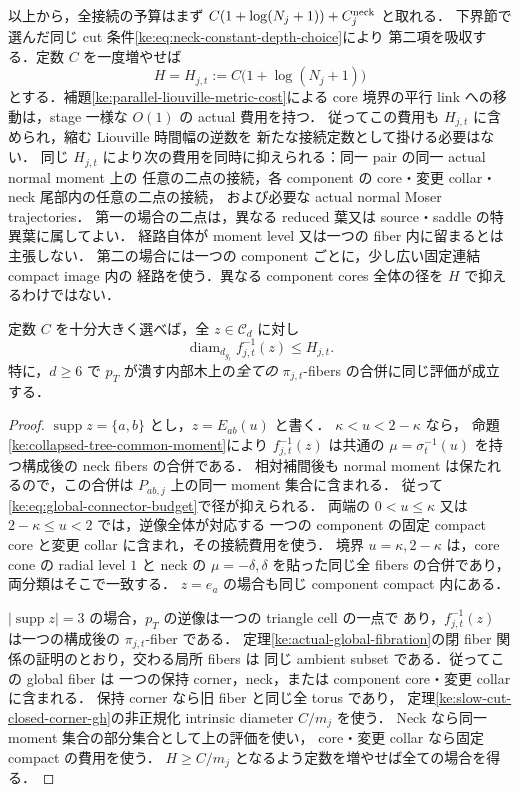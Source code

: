 以上から，全接続の予算はまず
$C(1+\log(N_j+1))+C_j^{\rm neck}$ と取れる．
下界節で選んだ同じ cut 条件\eqref{ke:eq:neck-constant-depth-choice}により
第二項を吸収する．定数 $C$ を一度増やせば
\begin{equation}\label{ke:eq:global-connector-budget}
 H=H_{j,t}:=C\bigl(1+\log(N_j+1)\bigr)
\end{equation}
とする．補題\ref{ke:parallel-liouville-metric-cost}による
core 境界の平行 link への移動は，stage 一様な $O(1)$ の actual 費用を持つ．
従ってこの費用も $H_{j,t}$ に含められ，縮む Liouville 時間幅の逆数を
新たな接続定数として掛ける必要はない．
同じ $H_{j,t}$ により次の費用を同時に抑えられる：同一 pair の同一 actual normal moment 上の
任意の二点の接続，各 component の core・変更 collar・neck 尾部内の任意の二点の接続，
および必要な actual normal Moser trajectories．
第一の場合の二点は，異なる reduced 葉又は source・saddle の特異葉に属してよい．
経路自体が moment level 又は一つの fiber 内に留まるとは主張しない．
第二の場合には一つの component ごとに，少し広い固定連結 compact image 内の
経路を使う．異なる component cores 全体の径を $H$ で抑えるわけではない．

\begin{proposition}
\label{ke:collapsed-tree-full-fiber-collapse}
定数 $C$ を十分大きく選べば，全 $z\in\mathcal C_d$ に対し
\begin{equation}\label{ke:eq:full-fiber-diameter-upper}
 \operatorname{diam}_{d_{g_t}} f_{j,t}^{-1}(z)\le H_{j,t}.
\end{equation}
特に，$d\ge6$ で $p_T$ が潰す内部木上の\emph{全ての}
$\pi_{j,t}$-fibers の合併に同じ評価が成立する．
\end{proposition}

\begin{proof}
$\operatorname{supp}z=\{a,b\}$ とし，$z=E_{ab}(u)$ と書く．
$\kappa<u<2-\kappa$ なら，
命題\ref{ke:collapsed-tree-common-moment}により
$f_{j,t}^{-1}(z)$ は共通の
$\mu=\sigma_t^{-1}(u)$ を持つ構成後の neck fibers の合併である．
相対補間後も normal moment は保たれるので，この合併は
$P_{ab,j}$ 上の同一 moment 集合に含まれる．
従って\eqref{ke:eq:global-connector-budget}で径が抑えられる．
両端の $0<u\le\kappa$ 又は $2-\kappa\le u<2$ では，逆像全体が対応する
一つの component の固定 compact core と変更 collar に含まれ，その接続費用を使う．
境界 $u=\kappa,2-\kappa$ は，core cone の radial level $1$ と neck の
$\mu=-\delta,\delta$ を貼った同じ全 fibers の合併であり，両分類はそこで一致する．
$z=e_a$ の場合も同じ component compact 内にある．

$|\operatorname{supp}z|=3$ の場合，$p_T$ の逆像は一つの triangle cell の一点で
あり，$f_{j,t}^{-1}(z)$ は一つの構成後の $\pi_{j,t}$-fiber である．
定理\ref{ke:actual-global-fibration}の閉 fiber 関係の証明のとおり，交わる局所 fibers は
同じ ambient subset である．従ってこの global fiber は
一つの保持 corner，neck，または component core・変更 collar に含まれる．
保持 corner なら旧 fiber と同じ全 torus であり，
定理\ref{ke:slow-cut-closed-corner-gh}の非正規化 intrinsic diameter $C/m_j$ を使う．
Neck なら同一 moment 集合の部分集合として上の評価を使い，
core・変更 collar なら固定 compact の費用を使う．
$H\ge C/m_j$ となるよう定数を増やせば全ての場合を得る．
\end{proof}

